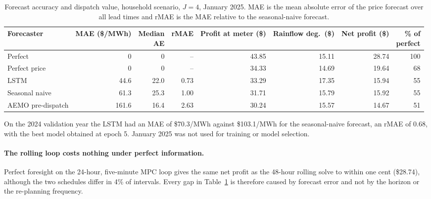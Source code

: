 \begin{table}[htbp]
    \centering
    \small
    \caption{Forecast accuracy and dispatch value, household scenario, $J=4$, January
    2025. MAE is the mean absolute error of the price forecast over all lead times and
    rMAE is the MAE relative to the seasonal-naive forecast.}
    \label{tab:mpc:headline}
    \begin{tabular}{@{}lrrrrrrr@{}}
        \toprule
        Forecaster & \shortstack{MAE\\(\$/MWh)} & \shortstack{Median\\AE} & rMAE &
        \shortstack{Profit\\at meter (\$)} & \shortstack{Rainflow\\deg.\ (\$)} &
        \shortstack{Net\\profit (\$)} & \shortstack{\% of\\perfect} \\
        \midrule
        Perfect                  & 0     & 0    & --   & 43.85 & 15.11 & 28.74 & 100 \\
        Perfect price            & 0     & 0    & --   & 34.33 & 14.69 & 19.64 & 68 \\
        LSTM                     & 44.6  & 22.0 & 0.73 & 33.29 & 17.35 & 15.94 & 55 \\
        Seasonal naive           & 61.3  & 25.3 & 1.00 & 31.71 & 15.79 & 15.92 & 55 \\
        AEMO pre-dispatch        & 161.6 & 16.4 & 2.63 & 30.24 & 15.57 & 14.67 & 51 \\
        \bottomrule
    \end{tabular}
\end{table}

On the 2024 validation year the LSTM had an MAE of \$70.3/MWh against \$103.1/MWh for
the seasonal-naive forecast, an rMAE of 0.68, with the best model obtained at epoch 5.
January 2025 was not used for training or model selection.

\paragraph{The rolling loop costs nothing under perfect information.}
Perfect foresight on the 24-hour, five-minute MPC loop gives the same net profit as the
48-hour rolling solve to within one cent (\$28.74), although the two schedules differ in
4\% of intervals. Every gap in Table~\ref{tab:mpc:headline} is therefore caused by
forecast error and not by the horizon or the re-planning frequency.

